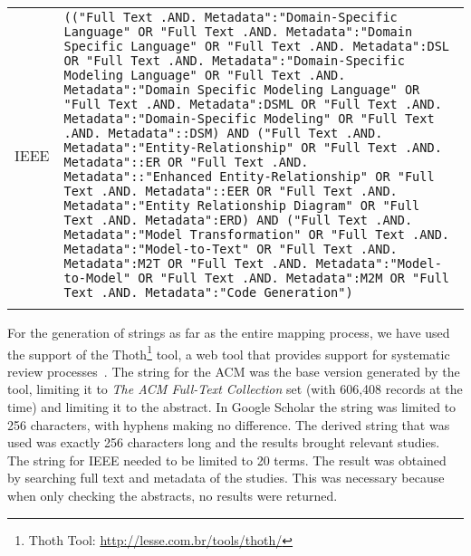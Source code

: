 \begin{table}[!htb]
\begin{tabular}{m{1.0cm}m{14.0cm}}
\T IEEE & \texttt{(("Full Text .AND. Metadata":"Domain-Specific Language" OR "Full Text .AND. Metadata":"Domain Specific Language" OR "Full Text .AND. Metadata":DSL OR "Full Text .AND. Metadata":"Domain-Specific Modeling Language" OR "Full Text .AND. Metadata":"Domain Specific Modeling Language" OR "Full Text .AND. Metadata":DSML OR "Full Text .AND. Metadata":"Domain-Specific Modeling" OR "Full Text .AND. Metadata"::DSM) \linebreak AND \linebreak ("Full Text .AND. Metadata":"Entity-Relationship" OR "Full Text .AND. Metadata"::ER OR "Full Text .AND. Metadata"::"Enhanced Entity-Relationship" OR "Full Text .AND. Metadata"::EER OR "Full Text .AND. Metadata":"Entity Relationship Diagram" OR "Full Text .AND. Metadata":ERD) \linebreak AND \linebreak ("Full Text .AND. Metadata":"Model Transformation" OR "Full Text .AND. Metadata":"Model-to-Text" OR "Full Text .AND. Metadata":M2T OR "Full Text .AND. Metadata":"Model-to-Model" OR "Full Text .AND. Metadata":M2M OR "Full Text .AND. Metadata":"Code Generation")} \\
\noalign{\smallskip} 
\toprule
\end{tabular}
\end{table}    

For the generation of strings as far as the entire mapping process, we have used the support of the Thoth\footnote{Thoth Tool: \url{http://lesse.com.br/tools/thoth/}} tool, a web tool that provides support for systematic review processes~\cite{thoth:2019}.
The string for the ACM was the base version generated by the tool, limiting it to \textit{The ACM Full-Text Collection} set (with 606,408 records at the time) and limiting it to the abstract.
In Google Scholar the string was limited to 256 characters, with hyphens making no difference.
The derived string that was used was exactly 256 characters long and the results brought relevant studies.
The string for IEEE needed to be limited to 20 terms.
The result was obtained by searching full text and metadata of the studies.
This was necessary because when only checking the abstracts, no results were returned.

